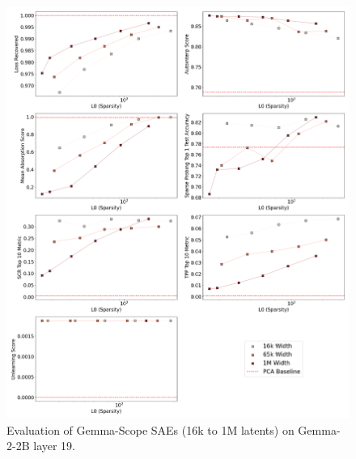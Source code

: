 \documentclass{article}
\theoremstyle{plain}
\theoremstyle{definition}
\theoremstyle{remark}
\begin{document}
\begin{figure}[h!]
    \centering
    \includegraphics[width=\columnwidth]{images/gemma-scope/plot_2x4_gemma-scope_gemma-2-2b_width_series_layer_19.png}
    \caption{Evaluation of Gemma-Scope SAEs (16k to 1M latents) on Gemma-2-2B layer 19.}
\end{figure}
\end{document}
